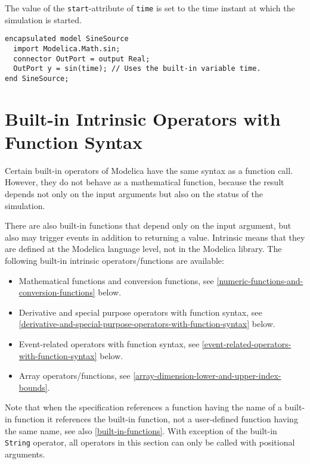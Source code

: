 The value of the \lstinline!start!-attribute of \lstinline!time! is set to the time instant at which the simulation is started.

\begin{example}
\begin{lstlisting}[language=modelica]
encapsulated model SineSource
  import Modelica.Math.sin;
  connector OutPort = output Real;
  OutPort y = sin(time); // Uses the built-in variable time.
end SineSource;
\end{lstlisting}
\end{example}

\section{Built-in Intrinsic Operators with Function Syntax}\label{built-in-intrinsic-operators-with-function-syntax}

Certain built-in operators of Modelica have the same syntax as a function call.
However, they do not behave as a mathematical function, because the result depends not only on the input arguments but also on the status of the simulation.

There are also built-in functions that depend only on the input argument, but also may trigger events in addition to returning a value.
Intrinsic means that they are defined at the Modelica language level, not in the Modelica library.
The following built-in intrinsic operators/functions are available:
\begin{itemize}
\item
  Mathematical functions and conversion functions, see \cref{numeric-functions-and-conversion-functions} below.
\item
  Derivative and special purpose operators with function syntax, see \cref{derivative-and-special-purpose-operators-with-function-syntax} below.
\item
  Event-related operators with function syntax, see \cref{event-related-operators-with-function-syntax} below.
\item
  Array operators/functions, see \cref{array-dimension-lower-and-upper-index-bounds}.
\end{itemize}

Note that when the specification references a function having the name of a built-in function it references the built-in function, not a user-defined function having the same name, see also \cref{built-in-functions}.
With exception of the built-in \lstinline!String! operator, all operators in this section can only be called with positional arguments.

